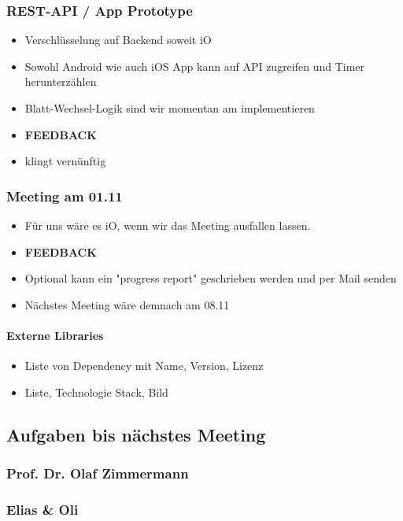 \hypertarget{rest-api-ux2f-app-prototype}{%
\subsubsection*{REST-API / App
Prototype}\label{rest-api-ux2f-app-prototype}}

\begin{itemize}

\item
  Verschlüsselung auf Backend soweit iO
\item
  Sowohl Android wie auch iOS App kann auf API zugreifen und Timer
  herunterzählen
\item
  \grqq Blatt-Wechsel-Logik\grqq{} sind wir momentan am implementieren
\item \textbf{FEEDBACK}
\item
  klingt vernünftig
\end{itemize}

\hypertarget{meeting-am-01.11}{%
\subsubsection*{Meeting am 01.11}\label{meeting-am-01.11}}

\begin{itemize}

\item
  Für uns wäre es iO, wenn wir das Meeting ausfallen lassen.
\item \textbf{FEEDBACK}
\item
  Optional kann ein "progress report" geschrieben werden und per Mail
  senden
\item
  Nächstes Meeting wäre demnach am 08.11
\end{itemize}

\hypertarget{externe-libraries}{%
\paragraph{Externe Libraries}\label{externe-libraries}}

\begin{itemize}

\item
  Liste von Dependency mit Name, Version, Lizenz
\item
  Liste, Technologie Stack, Bild
\end{itemize}

\hypertarget{aufgaben-bis-nachstes-meeting}{%
\subsection*{Aufgaben bis nächstes
Meeting}\label{aufgaben-bis-nachstes-meeting}}

\hypertarget{prof.-dr.-olaf-zimmermann}{%
\subsubsection*{Prof. Dr. Olaf
Zimmermann}\label{prof.-dr.-olaf-zimmermann}}

\hypertarget{elias-ux5cux26-oli}{%
\subsubsection*{Elias \& Oli}\label{elias-ux5cux26-oli}}